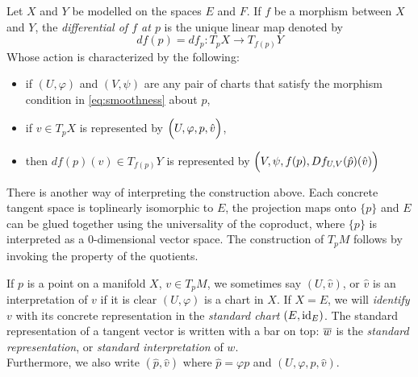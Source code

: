 \documentclass[../main-manifolds.tex]{subfiles}
\begin{document}
\begin{definition}
    Let $X$ and $Y$ be modelled on the spaces $E$ and $F$. If $f$ be a morphism between $X$ and $Y$, the \emph{differential of $f$ at $p$} is the unique linear map denoted by
    \begin{equation}\label{eq:differential-of-a-morphism}
        df(p)=df_p: T_p X\to T_{f(p)} Y
    \end{equation}
    Whose action is characterized by the following:
    \begin{itemize}
        \item if $(U,\varphi)$ and $(V,\psi)$ are any pair of charts that satisfy the morphism condition in \cref{eq:smoothness} about $p$,
        \item if $v\in T_p X$ is represented by $\qty\Big(U,\varphi,p, \hat{v})$,
        \item then $df(p)(v)\in T_{f(p)}Y$ is represented by $\qty\Big(V,\psi, f(p), Df_{U,V}(\hat{p})(\hat{v}))$
    \end{itemize}
\end{definition}
\begin{note}
    There is another way of interpreting the construction above. Each concrete tangent space is toplinearly isomorphic to $E$, the projection maps onto $\{p\}$ and $E$ can be glued together using the universality of the coproduct, where $\{p\}$ is interpreted as a $0$-dimensional vector space. The construction of $T_pM$ follows by invoking the property of the quotients.
\end{note}
\begin{remark}\label{rmk:omission-of-chart-in-concrete-rep}
    If $p$ is a point on a manifold $X$, $v\in T_p M$, we sometimes say $(U,\hat{v})$, or $\hat{v}$ is an interpretation of $v$ if it is clear $(U,\varphi)$ is a chart in $X$. If $X=E$, we will \emph{identify} $v$ with its concrete representation in the \emph{standard chart} $(E,\operatorname{id}_{E})$. The standard representation of a tangent vector is written with a bar on top: $\overline{w}$ is the \emph{standard representation}, or \emph{standard interpretation} of $w$.\\

    Furthermore, we also write $(\hat{p},\hat{v})$ where $\hat{p} = \varphi p$ and $(U,\varphi, p, \hat{v})$.
\end{remark}
\end{document}
